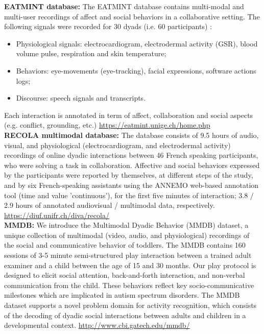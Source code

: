 \textbf{EATMINT database: }
The EATMINT database contains multi-modal and multi-user recordings of affect and social behaviors in a collaborative setting. The following signals were recorded for 30 dyads (i.e. 60 participants) :
\begin{itemize}
\item Physiological signals: electrocardiogram, electrodermal activity (GSR), blood volume pulse, respiration and skin temperature;
\item Behaviors: eye-movements (eye-tracking), facial expressions, software actions logs;
\item Discourse: speech signals and transcripts.
\end{itemize}
Each interaction is annotated in term of affect, collaboration and social aspects (e.g. conflict, grounding, etc.) \url{https://eatmint.unige.ch/home.php}\\

\textbf{RECOLA multimodal database:} The database consists of 9.5 hours of audio, visual, and physiological (electrocardiogram, and electrodermal activity) recordings of online dyadic interactions between 46 French speaking participants, who were solving a task in collaboration. Affective and social behaviors expressed by the participants were reported by themselves, at different steps of the study, and by six French-speaking assistants using the ANNEMO web-based annotation tool (time and value 'continuous'), for the first five minutes of interaction; 3.8 / 2.9 hours of annotated audiovisual / multimodal data, respectively. \url{https://diuf.unifr.ch/diva/recola/}\\

\textbf{MMDB:} We introduce the Multimodal Dyadic Behavior (MMDB) dataset, a unique collection of multimodal (video, audio, and physiological) recordings of the social and communicative behavior of toddlers. The MMDB contains 160 sessions of 3-5 minute semi-structured play interaction between a trained adult examiner and a child between the age of 15 and 30 months. Our play protocol is designed to elicit social attention, back-and-forth interaction, and non-verbal communication from the child. These behaviors reflect key socio-communicative milestones which are implicated in autism spectrum disorders. The MMDB dataset supports a novel problem domain for activity recognition, which consists of the decoding of dyadic social interactions between adults and children in a developmental context. \url{http://www.cbi.gatech.edu/mmdb/}

